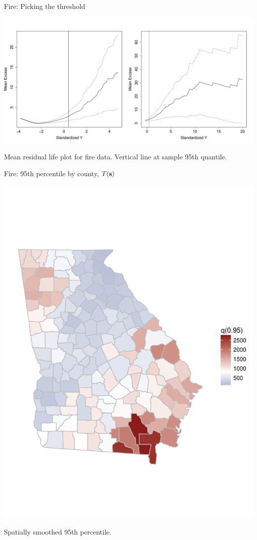 \documentclass{beamer}
\begin{document}
\begin{frame}{Fire: Picking the threshold}
	\begin{center}
		\includegraphics[width=1\textwidth]{fire-mrl-plots}

		Mean residual life plot for fire data. Vertical line at sample 95th quantile.
	\end{center}
\end{frame}

\begin{frame}{Fire: 95th percentile by county, $T(\mathbf{s})$}\vspace{-35pt}
	\begin{center}
		\includegraphics[height=0.95\textheight]{fire-spatial-q95}
		\vspace{-3em}

		Spatially smoothed 95th percentile.
	\end{center}
\end{frame}
\end{document}
